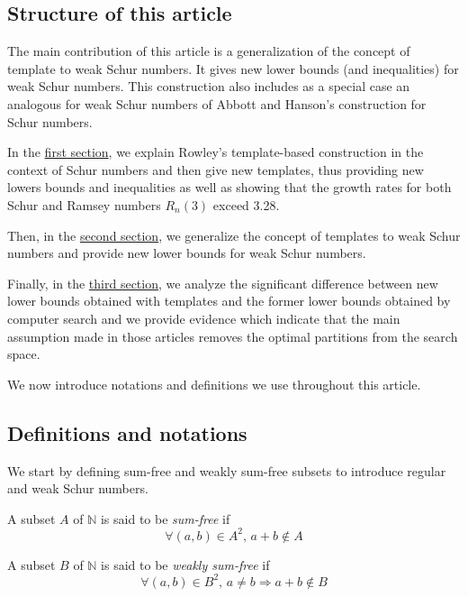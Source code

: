 \subsection{Structure of this article}

\qquad The main contribution of this article is a generalization of the concept of template to weak Schur numbers. 
It gives new lower bounds (and inequalities) for weak Schur numbers. This construction also includes as a special 
case an analogous for weak Schur numbers of Abbott and Hanson's construction for Schur numbers.

\par
In the \hyperref[Schur]{first section}, we explain Rowley's template-based construction in the context of 
Schur numbers and then give new templates, thus providing new lowers bounds and inequalities as well as 
showing that the growth rates for both Schur and Ramsey numbers \(R_n(3)\) exceed 3.28. 

\par
Then, in the \hyperref[WeakSchur]{second section}, we generalize the concept of templates to weak Schur numbers 
and provide new lower bounds for weak Schur numbers. 

\par
Finally, in the \hyperref[SearchSpace]{third section}, we analyze the significant difference between new lower 
bounds obtained with templates and the former lower bounds obtained by computer search and we provide 
evidence which indicate that the main assumption made in those articles removes the optimal partitions from the 
search space.

\par
We now introduce notations and definitions we use throughout this article.

\subsection{Definitions and notations}

\qquad We start by defining sum-free and weakly sum-free subsets to introduce regular and weak Schur numbers.

\begin{definition}
A subset \(A\) of \(\mathbb{N}\) is said to be \textit{sum-free} if
\[ \forall (a,b) \in A^2 \text{, } a+b \notin A\]
\end{definition}

\begin{definition}
A subset \(B\) of \(\mathbb{N}\) is said to be \textit{weakly sum-free} if
\[ \forall (a,b) \in B^2 \text{, } a \neq b \Longrightarrow a+b \notin B\]
\end{definition}

